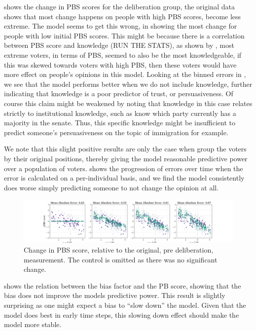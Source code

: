  shows the change in PBS scores for the deliberation group,
the original data shows that most change happens on people with high PBS
scores, become less extreme. The model seems to get this wrong, in showing the
most change for people with low initial PBS scores. This might be because there
is a correlation between PBS score and knowledge (RUN THE STATS), as shown by
\citet{fishkinCanDeliberationHave2024}, most extreme voters, in terms of PBS,
seemed to also be the most knowledgeable, if this was skewed towards voters
with high PBS, then these voters would have more effect on people's opinions in
this model. Looking at the binned errors in , we see
that the model performs better when we do not include knowledge, further
indicating that knowledge is a poor predictor of trust, or persuasiveness. Of
course this claim might be weakened by noting that knowledge in this case
relates strictly to institutional knowledge, such as know which party currently
has a majority in the senate. Thus, this specific knowledge might be
insufficient to predict someone's persuasiveness on the topic of immigration for
example.

We note that this slight positive results are only the case when group the
voters by their original positions, thereby giving the model reasonable
predictive power over a population of voters.  shows
the progression of errors over time when the error is calculated on a
per-individual basis, and we find the model consistently does worse simply predicting someone to not change the opinion at all.

\begin{figure}
	\begin{center}
		\includegraphics[width=\textwidth]{Figures/change_pbs_scores.png}
	\end{center}
	\caption{Change in PBS score, relative to the original, pre deliberation, measurement. The control is  omitted as there was no significant change.}\label{fig:delta_pbs}
\end{figure}

 shows the relation between the bias factor and the PB
score, showing that the bias does not improve the models predictive power. This
result is slightly surprising as one might expect a bias to ``slow down'' the
model. Given that the model does best in early time steps, this slowing down
effect should make the model more stable.


